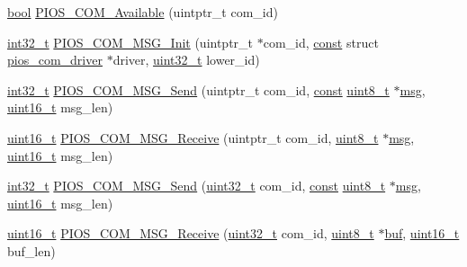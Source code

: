 \begin{DoxyCompactItemize}
\item 
\hyperlink{group___exported__types_gaf6a258d8f3ee5206d682d799316314b1}{bool} \hyperlink{group___p_i_o_s___c_o_m_ga5af0bd94df12381d390fae8925f99a03}{P\-I\-O\-S\-\_\-\-C\-O\-M\-\_\-\-Available} (uintptr\-\_\-t com\-\_\-id)
\item 
\hyperlink{group___n_a_m_e_gafd12020da5a235dfcf0c3c748fb5baed}{int32\-\_\-t} \hyperlink{group___p_i_o_s___c_o_m_ga187560edfa4a2c937b78a0655cbfe8d4}{P\-I\-O\-S\-\_\-\-C\-O\-M\-\_\-\-M\-S\-G\-\_\-\-Init} (uintptr\-\_\-t $\ast$com\-\_\-id, \hyperlink{group___n_a_m_e_ga7ae6d0e43244213b34de2c2b9aa30da6}{const} struct \hyperlink{structpios__com__driver}{pios\-\_\-com\-\_\-driver} $\ast$driver, \hyperlink{stdint_8h_a435d1572bf3f880d55459d9805097f62}{uint32\-\_\-t} lower\-\_\-id)
\item 
\hyperlink{group___n_a_m_e_gafd12020da5a235dfcf0c3c748fb5baed}{int32\-\_\-t} \hyperlink{group___p_i_o_s___c_o_m_ga219314be39648cc0388a74f42aa55655}{P\-I\-O\-S\-\_\-\-C\-O\-M\-\_\-\-M\-S\-G\-\_\-\-Send} (uintptr\-\_\-t com\-\_\-id, \hyperlink{group___n_a_m_e_ga7ae6d0e43244213b34de2c2b9aa30da6}{const} \hyperlink{stdint_8h_aba7bc1797add20fe3efdf37ced1182c5}{uint8\-\_\-t} $\ast$\hyperlink{group___o_s_d_module_ga31fe24ba18a63ea1e8cdb622e7ece509}{msg}, \hyperlink{stdint_8h_a273cf69d639a59973b6019625df33e30}{uint16\-\_\-t} msg\-\_\-len)
\item 
\hyperlink{stdint_8h_a273cf69d639a59973b6019625df33e30}{uint16\-\_\-t} \hyperlink{group___p_i_o_s___c_o_m_ga3944f281a0f407a0e76b1bb3ac325e64}{P\-I\-O\-S\-\_\-\-C\-O\-M\-\_\-\-M\-S\-G\-\_\-\-Receive} (uintptr\-\_\-t com\-\_\-id, \hyperlink{stdint_8h_aba7bc1797add20fe3efdf37ced1182c5}{uint8\-\_\-t} $\ast$\hyperlink{group___o_s_d_module_ga31fe24ba18a63ea1e8cdb622e7ece509}{msg}, \hyperlink{stdint_8h_a273cf69d639a59973b6019625df33e30}{uint16\-\_\-t} msg\-\_\-len)
\item 
\hyperlink{group___n_a_m_e_gafd12020da5a235dfcf0c3c748fb5baed}{int32\-\_\-t} \hyperlink{group___p_i_o_s___c_o_m_ga6f9d0b6877a3c996aab0aff76a32819d}{P\-I\-O\-S\-\_\-\-C\-O\-M\-\_\-\-M\-S\-G\-\_\-\-Send} (\hyperlink{stdint_8h_a435d1572bf3f880d55459d9805097f62}{uint32\-\_\-t} com\-\_\-id, \hyperlink{group___n_a_m_e_ga7ae6d0e43244213b34de2c2b9aa30da6}{const} \hyperlink{stdint_8h_aba7bc1797add20fe3efdf37ced1182c5}{uint8\-\_\-t} $\ast$\hyperlink{group___o_s_d_module_ga31fe24ba18a63ea1e8cdb622e7ece509}{msg}, \hyperlink{stdint_8h_a273cf69d639a59973b6019625df33e30}{uint16\-\_\-t} msg\-\_\-len)
\item 
\hyperlink{stdint_8h_a273cf69d639a59973b6019625df33e30}{uint16\-\_\-t} \hyperlink{group___p_i_o_s___c_o_m_gae5a107b30db7282de1e3cfbb2c1622e8}{P\-I\-O\-S\-\_\-\-C\-O\-M\-\_\-\-M\-S\-G\-\_\-\-Receive} (\hyperlink{stdint_8h_a435d1572bf3f880d55459d9805097f62}{uint32\-\_\-t} com\-\_\-id, \hyperlink{stdint_8h_aba7bc1797add20fe3efdf37ced1182c5}{uint8\-\_\-t} $\ast$\hyperlink{mavlink__helpers_8h_af5c51bef7cca88bcb22f0517fdb06153}{buf}, \hyperlink{stdint_8h_a273cf69d639a59973b6019625df33e30}{uint16\-\_\-t} buf\-\_\-len)

\end{DoxyCompactItemize}
